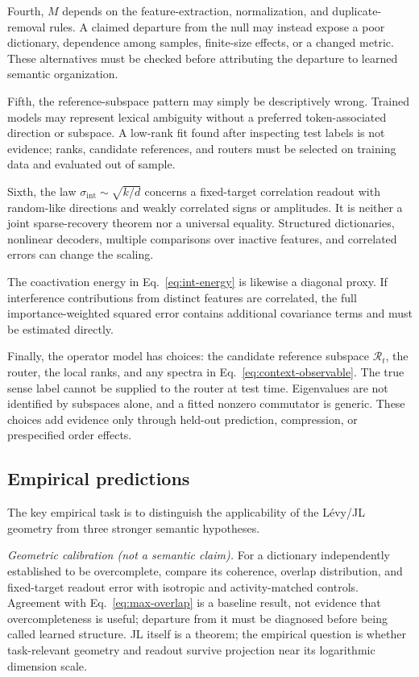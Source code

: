 \documentclass[
  aps,
  reprint,
  superscriptaddress,
  floatfix,
  nofootinbib,
  longbibliography
]{revtex4-2}
\newcommand{\Msem}{M}
\newcommand{\sint}{\sigma_{\mathrm{int}}}
\begin{document}
Fourth, $\Msem$ depends on the feature-extraction, normalization, and
duplicate-removal rules.  A claimed departure from the null may instead expose
a poor dictionary, dependence among samples, finite-size effects, or a changed
metric.  These alternatives must be checked before attributing the departure
to learned semantic organization.

Fifth, the reference-subspace pattern may simply be descriptively wrong.
Trained models may represent lexical ambiguity without a preferred token-associated
direction or subspace.  A low-rank fit found after inspecting test labels is
not evidence; ranks, candidate references, and routers must be selected on
training data and evaluated out of sample.

Sixth, the law $\sint\sim\sqrt{k/d}$ concerns a fixed-target correlation
readout with random-like directions and weakly correlated signs or amplitudes.
It is neither a joint sparse-recovery theorem nor a universal equality.
Structured dictionaries, nonlinear decoders, multiple comparisons over
inactive features, and correlated errors can change the scaling.

The coactivation energy in Eq.~\eqref{eq:int-energy} is likewise a diagonal
proxy.  If interference contributions from distinct features are correlated,
the full importance-weighted squared error contains additional covariance
terms and must be estimated directly.

Finally, the operator model has choices: the candidate reference subspace
$\mathcal R_t$, the router, the local ranks, and any spectra in
Eq.~\eqref{eq:context-observable}.  The true sense label cannot be supplied to
the router at test time.  Eigenvalues are not identified by subspaces alone,
and a fitted nonzero commutator is generic.  These choices add evidence only
through held-out prediction, compression, or prespecified order effects.

\subsection{Empirical predictions}
\label{sec:predictions}

The key empirical task is to distinguish the applicability of the
L\'evy/JL geometry from three stronger semantic hypotheses.

\emph{Geometric calibration (not a semantic claim).}
For a dictionary independently established to be overcomplete, compare its
coherence, overlap distribution, and fixed-target readout error with isotropic
and activity-matched controls.  Agreement with Eq.~\eqref{eq:max-overlap} is a
baseline result, not evidence that overcompleteness is useful; departure from
it must be diagnosed before being called learned structure.  JL itself is a
theorem; the empirical question is whether task-relevant geometry and readout
survive projection near its logarithmic dimension scale.
\end{document}
